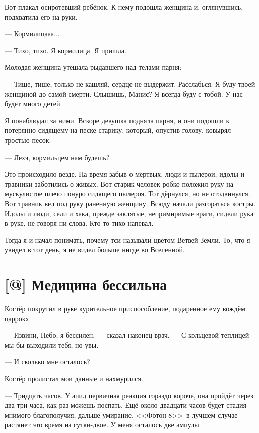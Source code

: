 Вот плакал осиротевший ребёнок.
К нему подошла женщина и, оглянувшись, подхватила его на руки.

--- Кормилицааа...

--- Тихо, тихо.
Я кормилица.
Я пришла.

Молодая женщина утешала рыдавшего над телами парня:

--- Тише, тише, только не кашляй, сердце не выдержит.
Расслабься.
Я буду твоей женщиной до самой смерти.
Слышишь, Манис?
Я всегда буду с тобой.
У нас будет много детей.

Я понаблюдал за ними.
Вскоре девушка подняла парня, и они подошли к потерянно сидящему на песке старику, который, опустив голову, ковырял тростью песок:

--- Лехэ, кормильцем нам будешь?

Это происходило везде.
На время забыв о мёртвых, люди и пылерои, идолы и травники заботились о живых.
Вот старик-человек робко положил руку на мускулистое плечо понуро сидящего пылероя.
Тот дёрнулся, но не отодвинулся.
Вот травник вел под руку раненную женщину.
Всюду начали разгораться костры.
Идолы и люди, сели и хака, прежде заклятые, непримиримые враги, сидели рука в руке, не говоря ни слова.
Кто-то тихо напевал.

Тогда я и начал понимать, почему тси называли цветом Ветвей Земли.
То, что я увидел в тот день, я не видел больше нигде во Вселенной.

\section{[@] Медицина бессильна}

\textspace

Костёр покрутил в руке курительное приспособление, подаренное ему вождём царрокх.

--- Извини, Небо, я бессилен, --- сказал наконец врач.
--- С кольцевой теплицей мы бы выходили тебя, но увы.

--- И сколько мне осталось?

Костёр пролистал мои данные и нахмурился.

--- Тридцать часов.
У апид первичная реакция гораздо короче, она пройдёт через два-три часа, как раз можешь поспать.
Ещё около двадцати часов будет стадия мнимого благополучия, дальше умирание.
<<Фотон-8>>\FM\ в лучшем случае растянет это время на сутки-двое.
У меня осталось две ампулы.

